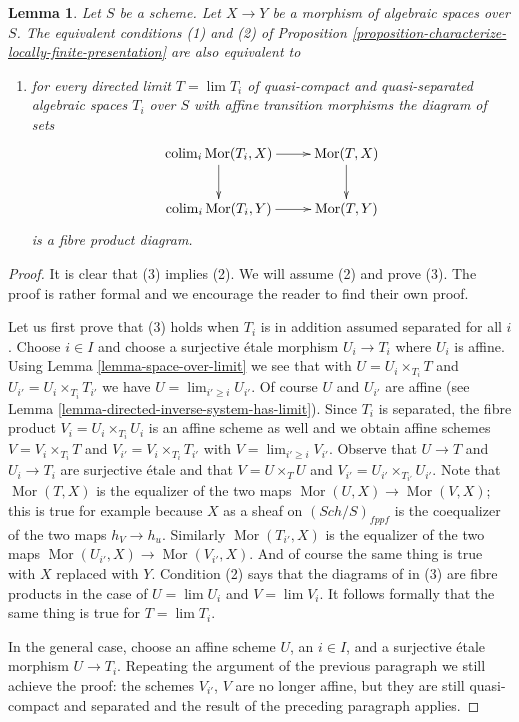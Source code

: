 \documentclass{stacks-project}
\theoremstyle{plain}
\newtheorem{lemma}[subsection]{Lemma}
\theoremstyle{definition}
\theoremstyle{remark}
\numberwithin{equation}{subsection}
\def\lim{\mathop{\mathrm{lim}}\nolimits}
\def\colim{\mathop{\mathrm{colim}}\nolimits}
\def\Sch{\mathit{Sch}}
\def\Mor{\mathop{\mathrm{Mor}}\nolimits}
\begin{document}
\begin{lemma}
\label{lemma-better-characterize-relative-limit-preserving}
Let $S$ be a scheme. Let $X \to Y$ be a morphism of algebraic spaces
over $S$. The equivalent conditions (1) and (2) of
Proposition \ref{proposition-characterize-locally-finite-presentation}
are also equivalent to
\begin{enumerate}
\item[(3)] for every directed limit $T = \lim T_i$ of quasi-compact
and quasi-separated algebraic spaces $T_i$ over $S$ with affine
transition morphisms the diagram of sets
$$
\xymatrix{
\colim_i \Mor(T_i, X) \ar[r] \ar[d] & \Mor(T, X) \ar[d] \\
\colim_i \Mor(T_i, Y) \ar[r] & \Mor(T, Y)
}
$$
is a fibre product diagram.
\end{enumerate}
\end{lemma}

\begin{proof}
It is clear that (3) implies (2). We will assume (2) and prove (3).
The proof is rather formal and we encourage the reader to find their
own proof.

\medskip\noindent
Let us first prove that (3) holds
when $T_i$ is in addition assumed separated for all $i$.
Choose $i \in I$ and choose a surjective \'etale morphism $U_i \to T_i$
where $U_i$ is affine. Using Lemma \ref{lemma-space-over-limit}
we see that with $U = U_i \times_{T_i} T$ and
$U_{i'} = U_i \times_{T_i} T_{i'}$ we have $U = \lim_{i' \geq i} U_{i'}$.
Of course $U$ and $U_{i'}$ are affine (see
Lemma \ref{lemma-directed-inverse-system-has-limit}).
Since $T_i$ is separated, the fibre product $V_i = U_i \times_{T_i} U_i$
is an affine scheme as well and we obtain affine schemes
$V = V_i \times_{T_i} T$ and
$V_{i'} = V_i \times_{T_i} T_{i'}$ with $V = \lim_{i' \geq i} V_{i'}$.
Observe that $U \to T$ and $U_i \to T_i$ are surjective \'etale and
that $V = U \times_T U$ and $V_{i'} = U_{i'} \times_{T_{i'}} U_{i'}$.
Note that $\Mor(T, X)$ is the equalizer of the two maps
$\Mor(U, X) \to \Mor(V, X)$; this is true for example because
$X$ as a sheaf on $(\Sch/S)_{fppf}$ is the coequalizer
of the two maps $h_V \to h_u$. Similarly
$\Mor(T_{i'}, X)$ is the equalizer of the
two maps $\Mor(U_{i'}, X) \to \Mor(V_{i'}, X)$.
And of course the same thing is true with $X$ replaced with $Y$.
Condition (2) says that the diagrams of in (3) are fibre products
in the case of $U = \lim U_i$ and $V = \lim V_i$.
It follows formally that the same thing is true for $T = \lim T_i$.

\medskip\noindent
In the general case, choose an affine scheme $U$, an $i \in I$,
and a surjective \'etale morphism $U \to T_i$. Repeating the
argument of the previous paragraph we still achieve the proof:
the schemes $V_{i'}$, $V$ are no longer affine, but they are
still quasi-compact and
separated and the result of the preceding paragraph applies.
\end{proof}
\end{document}
